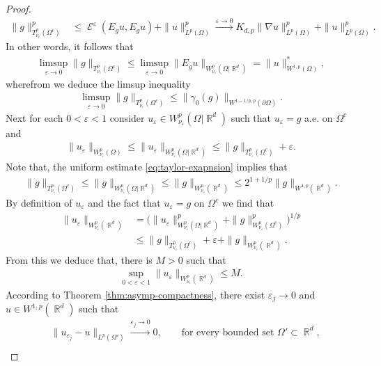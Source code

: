 \documentclass[12pt, reqno]{amsart}%
\theoremstyle{plain}  %
\theoremstyle{definition}  %
\numberwithin{equation}{section}
\DeclareMathOperator{\cE}{\mathcal{E}}
\DeclareMathOperator{\R}{\mathbb{R}}
\newcommand{\eps}{\varepsilon}
\begin{document}
\begin{proof}
\begin{align*}
\|g\|^p_{T^p_{\nu_\eps}(\Omega^c)}
&\leq \cE^\eps(E_g u, E_g u) + \|u\|^p_{L^p(\Omega)}
\xrightarrow{\eps\to0} K_{d,p}\|\nabla u\|^p_{L^{p}(\Omega)}+\|u\|^p_{L^p(\Omega)}.
\end{align*}
In other words, it follows that
\begin{align*}
\limsup_{\eps\to0}	\|g\|_{T^p_{\nu_\eps}(\Omega^c)}\leq  \limsup_{\eps\to0} \|E_g u\|_{W^p_{\nu_\eps}(\Omega|\R^d)}= \| u\|^{*}_{W^{1,p}(\Omega)},
\end{align*}
wherefrom  we deduce the limsup inequality
\begin{align}\label{eq:limsup-trace}
\limsup_{\eps\to0}	\|g\|_{T^p_{\nu_\eps}(\Omega^c)}\leq
\|\gamma_0(g)\|_{W^{1-1/p ,p}(\partial\Omega)}.
\end{align}
Next for  each $0<\eps<1$ consider  $u_\eps \in W^p_{\nu_\eps}(\Omega|\R^d)$ such that $u_\eps= g$ a.e. on $\Omega^c$ and
\begin{align*}
\|u_\eps\|_{W^p_{\nu_\eps}(\Omega)}\leq  \|u_\eps\|_{W^p_{\nu_\eps}(\Omega|\R^d)}
\leq \|g\|_{T^p_{\nu_\eps}(\Omega^c )} + \eps.
\end{align*}
Note that, the uniform estimate  \eqref{eq:taylor-exapnsion}  implies that
\begin{align*}
\|g\|_{T^p_{\nu_\eps}(\Omega^c )} \leq  \|g\|_{W^p_{\nu_\eps}(\Omega|\R^d)}
\leq  \|g\|_{W^p_{\nu_\eps}(\R^d )} \leq 2^{1+1/p}\|g\|_{W^{1,p}(\R^d)}.
\end{align*}
By definition of $u_\eps$ and the fact that $u_\eps = g$ on $\Omega^c$ we find that
\begin{align*}
\|u_\eps\|_{W^p_{\nu_\eps}(\R^d)}
&=\big(\|u_\eps\|^p_{W^p_{\nu_\eps}(\Omega|\R^d)}+ \|g\|^p_{W^p_{\nu_\eps}(\Omega^c)}\big)^{1/p}\\
&\leq
\|g\|_{T^p_{\nu_\eps}(\Omega^c)}+\eps+ \|g\|_{W^p_{\nu_\eps}(\R^d)}.
\end{align*}
From this we deduce that,  there is $M>0$ such that
\begin{align*}
\sup_{0<\eps<1}\|u_\eps\|_{W^p_{\nu_\eps}(\R^d)}\leq  M.
\end{align*}
According to Theorem \ref{thm:asymp-compactness}, there exist  $\eps_j\to 0$ and $u\in W^{1,p}(\R^d)$ such that
\begin{align*}
&\|u_{\eps_j}- u\|_{L^p(\Omega')}\xrightarrow{\eps_j\to 0}0,\qquad\text{for every bounded set  $\Omega'\subset \R^d$,}
\\

\end{align*}
\end{proof}
\end{document}
